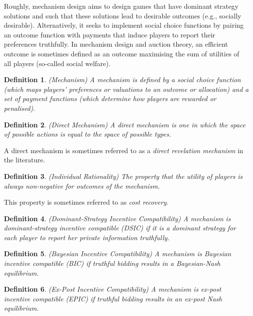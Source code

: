 \documentclass{article}
\newtheorem{definition}{Definition}
\begin{document}
Roughly, mechanism design aims to design games that have dominant strategy solutions and such that these solutions lead to desirable outcomes (e.g., socially desirable). Alternatively, it seeks to implement social choice functions by pairing an outcome function with payments that induce players to report their preferences truthfully. In mechanism design and auction theory, an efficient outcome is sometimes defined as an outcome maximising the sum of utilities of all players (so-called social welfare).

\begin{definition}
(Mechanism) A mechanism is defined by a social choice function (which maps players' preferences or valuations to an outcome or allocation) and a set of payment functions (which determine how players are rewarded or penalised).
\end{definition}


\begin{definition}
(Direct Mechanism) A direct mechanism is one in which the space of possible actions is equal to the space of possible types.
\end{definition}

A direct mechanism is sometimes referred to as a \textit{direct revelation mechanism} in the literature.

\begin{definition}
(Individual Rationality) The property that the utility of players is always non-negative for outcomes of the mechanism.
\end{definition}

This property is sometimes referred to as \textit{cost recovery}.

\begin{definition}
(Dominant-Strategy Incentive Compatibility) A mechanism is dominant-strategy incentive compatible (DSIC) if it is a dominant strategy for each player to report her private information truthfully.
\end{definition}

\begin{definition}
(Bayesian Incentive Compatibility) A mechanism is Bayesian incentive compatible (BIC) if truthful bidding results in a Bayesian-Nash equilibrium.
\end{definition}

\begin{definition}
(Ex-Post Incentive Compatibility) A mechanism is ex-post incentive compatible (EPIC) if truthful bidding results in an ex-post Nash equilibrium.
\end{definition}
\end{document}
